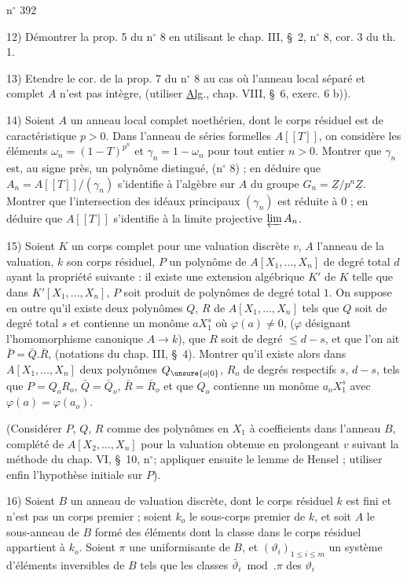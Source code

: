 \hfill n$^{\circ}$ 392

12) Démontrer la prop. 5 du n$^{\circ}$ 8 en utilisant le chap. III, \S~2, n$^{\circ}$ 8, cor. 3 du th. 1.

13) Etendre le cor. de la prop. 7 du n$^{\circ}$ 8 au cas où l'anneau local séparé et complet $A$ n'est pas intègre, (utiliser \uline{Alg}., chap. VIII, \S~6, exerc. 6 b)).

14) Soient $A$ un anneau local complet noethérien, dont le corps résiduel est de caractéristique $p>0$. Dans l'anneau de séries formelles $A[[T]]$, on considère les éléments $\omega_n=(1-T)^{p^n}$ et $\gamma_n=1-\omega_n$ pour tout entier $n>0$. Montrer que $\gamma_n$ est, au signe près, un polynôme distingué, (n$^{\circ}$ 8) ; en déduire que $A_n=A[[T]]/(\gamma_n)$ s'identifie à l'algèbre sur $A$ du groupe $G_n=\underline{Z}/p^n\underline{Z}$. Montrer que l'intersection des idéaux principaux $(\gamma_n)$ est réduite à $0$ ; en déduire que $A[[T]]$ s'identifie à la limite projective $\varprojlim A_n$.

15) Soient $K$ un corps complet pour une valuation discrète $v$, $A$ l'anneau de la valuation, $k$ son corps résiduel, $P$ un polynôme de $A[X_1,\ldots,X_n]$ de degré total $d$ ayant la propriété suivante : il existe une extension algébrique $K'$ de $K$ telle que dans $K'[X_1,\ldots,X_n]$, $P$ soit produit de polynômes de degré total $1$. On suppose en outre qu'il existe deux polynômes $Q$, $R$ de $A[X_1,\ldots,X_n]$ tels que $Q$ soit de degré total $s$ et contienne un monôme $aX_1^s$ où $\varphi(a)\ne 0$, ($\varphi$ désignant l'homomorphisme canonique $A\longrightarrow k$), que $R$ soit de degré $\leq d-s$, et que l'on ait $\bar P=\bar Q.\bar R$, (notations du chap. III, \S~4). Montrer qu'il existe alors dans $A[X_1,\ldots,X_n]$ deux polynômes $Q_{\unsure{o|0}}$, $R_o$ de degrés respectifs $s$, $d-s$, tels que $P=Q_oR_o$, $\bar Q=\bar Q_o$, $\bar R=\bar R_o$ et que $Q_o$ contienne un monôme $a_oX_1^s$ avec $\varphi(a)=\varphi(a_o)$.

(Considérer $P$, $Q$, $R$ comme des polynômes en $X_1$ à coefficients dans l'anneau $B$, complété de $A[X_2,\ldots,X_n]$ pour la valuation obtenue en prolongeant $v$ suivant la méthode du chap. VI, \S~10, n$^{\circ}$\qquad ; appliquer ensuite le lemme de Hensel ; utiliser enfin l'hypothèse initiale sur $P$).

16) Soient $B$ un anneau de valuation discrète, dont le corps résiduel $k$ est fini et n'est pas un corps premier ; soient $k_o$ le sous-corps premier de $k$, et soit $A$ le sous-anneau de $B$ formé des éléments dont la classe dans le corps résiduel appartient à $k_o$. Soient $\pi$ une uniformisante de $B$, et $(\vartheta_i)_{1\leq i\leq m}$ un système d'éléments inversibles de $B$ tels que les classes $\bar\vartheta_i\bmod.\pi$ des $\vartheta_i$
